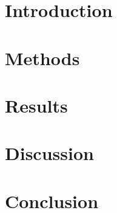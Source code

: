 \documentclass{article}
\begin{document}
\section{Introduction}
\section{Methods}
\section{Results}
\section{Discussion}
\section{Conclusion}
\end{document}
